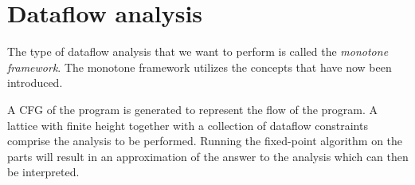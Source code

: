 \section{Dataflow analysis}
The type of dataflow analysis that we want to perform is called the \emph{monotone framework}.
The monotone framework utilizes the concepts that have now been introduced.

A CFG of the program is generated to represent the flow of the program.
A lattice with finite height together with a collection of dataflow constraints comprise the analysis to be performed.
Running the fixed-point algorithm on the parts will result in an approximation of the answer to the analysis which can then be interpreted.


